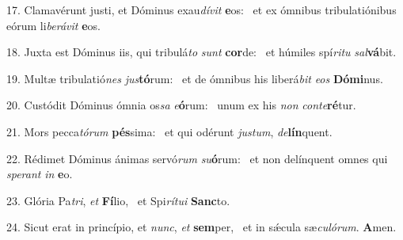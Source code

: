 17. Clamavérunt justi, et Dóminus exau\textit{dí}\textit{vit} \textbf{e}os: \ast\  et ex ómnibus tribulatiónibus eórum li\textit{be}\textit{rá}\textit{vit} \textbf{e}os.\

18. Juxta est Dóminus iis, qui tribulá\textit{to} \textit{sunt} \textbf{cor}de: \ast\  et húmiles spí\textit{ri}\textit{tu} \textit{sal}\textbf{vá}bit.\

19. Multæ tribulatió\textit{nes} \textit{jus}\textbf{tó}rum: \ast\  et de ómnibus his liberá\textit{bit} \textit{e}\textit{os} \textbf{Dó}\textbf{mi}nus.\

20. Custódit Dóminus ómnia os\textit{sa} \textit{e}\textbf{ó}rum: \ast\  unum ex his \textit{non} \textit{con}\textit{te}\textbf{ré}tur.\

21. Mors pecca\textit{tó}\textit{rum} \textbf{pés}sima: \ast\  et qui odérunt \textit{jus}\textit{tum}, \textit{de}\textbf{lín}quent.\

22. Rédimet Dóminus ánimas servó\textit{rum} \textit{su}\textbf{ó}rum: \ast\  et non delínquent omnes qui \textit{spe}\textit{rant} \textit{in} \textbf{e}o.\

23. Glória Pa\textit{tri}, \textit{et} \textbf{Fí}lio, \ast\  et Spi\textit{rí}\textit{tu}\textit{i} \textbf{Sanc}to.\

24. Sicut erat in princípio, et \textit{nunc}, \textit{et} \textbf{sem}per, \ast\  et in sǽcula sæ\textit{cu}\textit{ló}\textit{rum}. \textbf{A}men.\

